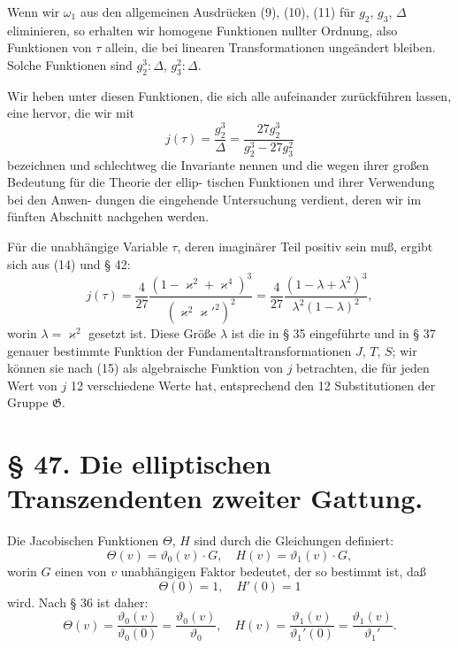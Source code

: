 \documentclass[12pt,a4paper]{article}
\theoremstyle{definition}
\begin{document}
Wenn wir $\omega_1$ aus den allgemeinen Ausdr\"{u}cken (9), (10), (11)
f\"{u}r $g_2$, $g_3$, $\Delta$ eliminieren,
so erhalten wir homogene Funktionen
nullter Ordnung, also Funktionen von $\tau$ allein, die bei linearen
Transformationen unge\"{a}ndert bleiben. Solche Funktionen
sind $g_2^3 : \Delta$, $g_3^2 : \Delta$.

Wir heben unter diesen Funktionen, die sich
alle aufeinander zur\"{u}ckf\"{u}hren lassen, eine hervor, die wir mit
\begin{equation}\tag{14}
j(\tau) = \frac{g_2^3}{\Delta} = \frac{27g_2^3}{g_2^3 - 27g_3^2}
\end{equation}
bezeichnen und schlechtweg die Invariante nennen und
die wegen ihrer gro\ss en Bedeutung f\"{u}r die Theorie der ellip-
tischen Funktionen und ihrer Verwendung bei den Anwen-
dungen die eingehende Untersuchung verdient, deren wir
im f\"{u}nften Abschnitt nachgehen werden.

F\"{u}r die unabh\"{a}ngige Variable $\tau$, deren imagin\"{a}rer Teil positiv
sein mu\ss , ergibt sich aus (14) und \S{} 42:
\begin{equation}\tag{15}
j(\tau) = \frac{4}{27} \frac{(1 - \varkappa^2 + \varkappa^4)^3}{(\varkappa^2\varkappa'^2)^2} = \frac{4}{27} \frac{(1 - \lambda + \lambda^2)^3}{\lambda^2(1 - \lambda)^2},
\end{equation}
worin $\lambda = \varkappa^2$ gesetzt ist. Diese Gr\"{o}\ss e $\lambda$ ist die in \S{} 35
eingef\"{u}hrte und in \S{} 37 genauer bestimmte Funktion der
Fundamentaltransformationen $J$, $T$, $S$; wir k\"{o}nnen sie
nach (15) als algebraische Funktion von $j$ betrachten, die
f\"{u}r jeden Wert von $j$ 12 verschiedene Werte hat, entsprechend
den 12 Substitutionen der Gruppe $\mathfrak{G}$.

\section*{\S{} 47. Die elliptischen Transzendenten zweiter Gattung.}

Die Jacobischen Funktionen $\Theta$, $H$ sind durch die
Gleichungen definiert:
\begin{equation}\tag{1}
\Theta(v) = \vartheta_0(v) \cdot G, \quad H(v) = \vartheta_1(v) \cdot G,
\end{equation}
worin $G$ einen von $v$ unabh\"{a}ngigen Faktor bedeutet, der
so bestimmt ist, da\ss
\begin{equation}\tag{2}
\Theta(0) = 1, \quad H'(0) = 1
\end{equation}
wird. Nach \S{} 36 ist daher:
\begin{equation}\tag{3}
\Theta(v) = \frac{\vartheta_0(v)}{\vartheta_0(0)} = \frac{\vartheta_0(v)}{\vartheta_0}, \quad
H(v) = \frac{\vartheta_1(v)}{\vartheta_1'(0)} = \frac{\vartheta_1(v)}{\vartheta_1'}.
\end{equation}
\end{document}
